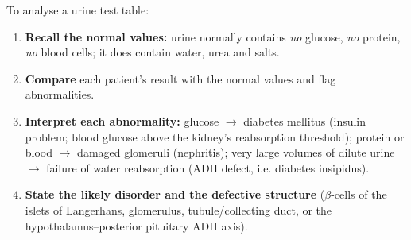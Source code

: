 \documentclass[11pt]{article}
\begin{document}
\begin{methode}
To analyse a urine test table:
\begin{enumerate}
\item \textbf{Recall the normal values:} urine normally contains \emph{no} glucose, \emph{no} protein, \emph{no} blood cells; it does contain water, urea and salts.
\item \textbf{Compare} each patient's result with the normal values and flag abnormalities.
\item \textbf{Interpret each abnormality:} glucose $\rightarrow$ diabetes mellitus (insulin problem; blood glucose above the kidney's reabsorption threshold); protein or blood $\rightarrow$ damaged glomeruli (nephritis); very large volumes of dilute urine $\rightarrow$ failure of water reabsorption (ADH defect, i.e. diabetes insipidus).
\item \textbf{State the likely disorder and the defective structure} ($\beta$-cells of the islets of Langerhans, glomerulus, tubule/collecting duct, or the hypothalamus--posterior pituitary ADH axis).
\end{enumerate}
\end{methode}
\end{document}
